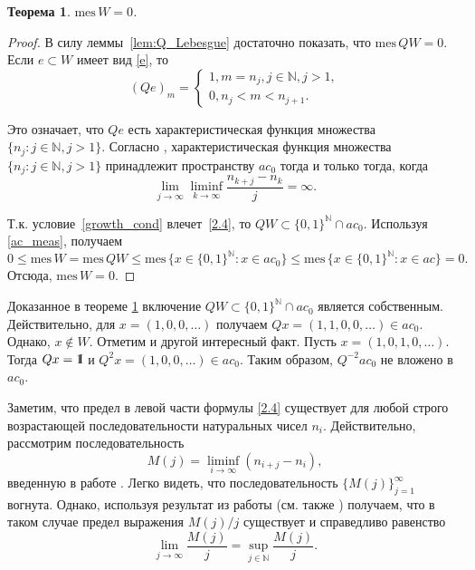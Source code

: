 \documentclass[12pt]{article}
\newcommand{\emm}{\mathrm{1\hspace{-0.3em} I}}
\newtheorem{thm}{Теорема}
\def\N{{\mathbb{N}}}
\def\mes{{\mathrm{mes}}}
\begin{document}
\begin{thm}\label{thm9}
$\mes \, W=0$.
\end{thm}

\begin{proof}
В силу леммы~\ref{lem:Q_Lebesgue} достаточно показать, что $\mes \, QW=0$. Если $e\subset W$ имеет вид \eqref{e}, то
$$(Qe)_m=\begin{cases}
1, m=n_j, j\in\N, j>1,\\
0, n_j<m<n_{j+1}.
\end{cases}$$

Это означает, что $Qe$ есть характеристическая функция множества $\{n_j: j\in \N, j>1\}$. Согласно \cite[Лемма 1]{Avdeev2019}, характеристическая функция множества $\{n_j: j\in \N, j>1\}$ принадлежит пространству $ac_0$ тогда и только тогда, когда
\begin{equation}\label{2.4}
    \lim\limits_{j\to\infty}\liminf_{k\to\infty}\frac{n_{k+j}-n_k}j=\infty.
\end{equation}

Т.к. условие~\eqref{growth_cond} влечет~\eqref{2.4}, то $QW \subset \{0,1\}^\N \cap ac_0$. Используя \eqref{ac_meas}, получаем
$$0\le \mes \, W= \mes \, QW\le \mes \, \{x\in \{0,1\}^\N: x\in ac_0\}\le \mes \, \{x\in \{0,1\}^\N: x\in ac\}=0.$$
Отсюда, $\mes \, W=0$.
\end{proof}

Доказанное в теореме \ref{thm9} включение $QW \subset \{0,1\}^\N \cap ac_0$ является собственным. Действительно, для $x=(1, 0, 0, \dots)$ получаем $Qx=(1,1, 0, 0, \dots)\in ac_0$. Однако, $x\notin W$. Отметим и другой интересный факт. Пусть $x=(1,0,1,0,\dots)$. Тогда $Qx=\emm$ и $Q^2x=(1,0,0, \dots)\in ac_0$. Таким образом, $Q^{-2}ac_0$ не вложено в $ac_0$.


Заметим, что предел в левой части формулы \eqref{2.4} существует для любой строго возрастающей последовательности натуральных чисел $n_i$. Действительно,  рассмотрим последовательность
\begin{equation*}
\label{eq:definition_M_j}
M(j) = \liminf_{i\to\infty} (n_{i+j} - n_i),
\end{equation*}
введенную в работе \cite{Avdeev2019}. Легко видеть, что последовательность $\{M(j)\}_{j=1}^\infty$ вогнута. Однако, используя результат из работы \cite{Fekete} (см. также \cite[I, Задача 98]{Polya72problems}) получаем, что в таком случае предел выражения $M(j)/j$ существует и справедливо равенство
$$\lim_{j\to\infty}\frac{M(j)}{j} =\sup_{j\in\N}\frac{M(j)}{j}.$$
\end{document}
